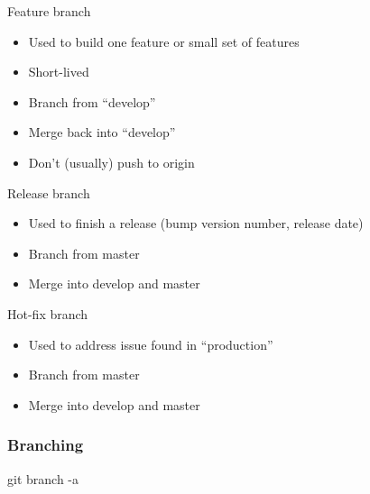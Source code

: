 \documentclass{beamer}
\begin{document}
\begin{frame}

  Feature branch

  \begin{itemize}
  \item Used to build one feature or small set of features
  \item Short-lived
  \item Branch from ``develop''
  \item Merge back into ``develop''
  \item Don't (usually) push to origin
  \end{itemize}

\end{frame}


\begin{frame}

  Release branch

  \begin{itemize}
  \item Used to finish a release (bump version number, release date)
  \item Branch from master
  \item Merge into develop and master
  \end{itemize}

\end{frame}

\begin{frame}

  Hot-fix branch

  \begin{itemize}
  \item Used to address issue found in ``production''
  \item Branch from master
  \item Merge into develop and master
  \end{itemize}

\end{frame}




\begin{frame}
\frametitle{Branching}
git branch -a

\end{frame}
\end{document}
